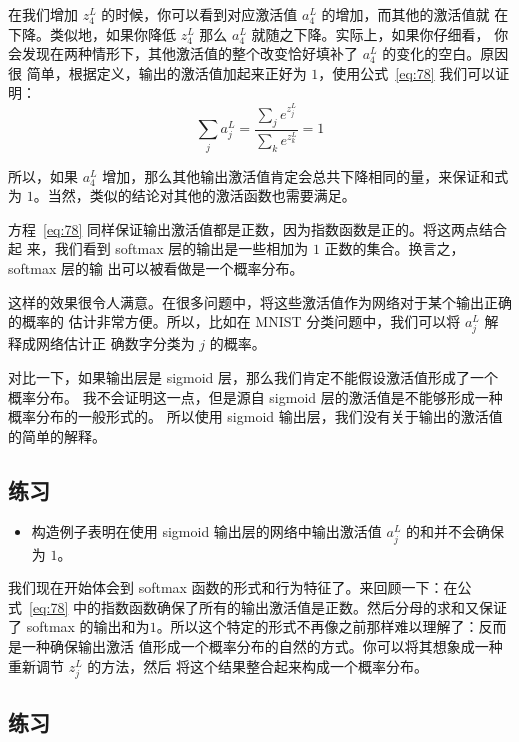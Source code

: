 在我们增加 $z^L_4$ 的时候，你可以看到对应激活值 $a^L_4$ 的增加，而其他的激活值就
在下降。类似地，如果你降低 $z^L_4$ 那么 $a^L_4$ 就随之下降。实际上，如果你仔细看，
你会发现在两种情形下，其他激活值的整个改变恰好填补了 $a^L_4$ 的变化的空白。原因很
简单，根据定义，输出的激活值加起来正好为 $1$，使用公式~\eqref{eq:78} 我们可以证
明：
\begin{equation}
  \sum_j a^L_j = \frac{\sum_j e^{z^L_j}}{\sum_k e^{z^L_k}} = 1
  \label{eq:79}\tag{79}
\end{equation}

所以，如果 $a^L_4$ 增加，那么其他输出激活值肯定会总共下降相同的量，来保证和式
为 $1$。当然，类似的结论对其他的激活函数也需要满足。

方程~\eqref{eq:78} 同样保证输出激活值都是正数，因为指数函数是正的。将这两点结合起
来，我们看到 softmax 层的输出是一些相加为 $1$ 正数的集合。换言之，softmax 层的输
出可以被看做是一个概率分布。

这样的效果很令人满意。在很多问题中，将这些激活值作为网络对于某个输出正确的概率的
估计非常方便。所以，比如在 MNIST 分类问题中，我们可以将 $a^L_j$ 解释成网络估计正
确数字分类为 $j$ 的概率。

对比一下，如果输出层是 sigmoid 层，那么我们肯定不能假设激活值形成了一个概率分布。
我不会证明这一点，但是源自 sigmoid 层的激活值是不能够形成一种概率分布的一般形式的。
所以使用 sigmoid 输出层，我们没有关于输出的激活值的简单的解释。

\subsection*{练习}

\begin{itemize}
\item 构造例子表明在使用 sigmoid 输出层的网络中输出激活值 $a^L_j$ 的和并不会确保
  为 $1$。
\end{itemize}

我们现在开始体会到 softmax 函数的形式和行为特征了。来回顾一下：在公
式~\eqref{eq:78} 中的指数函数确保了所有的输出激活值是正数。然后分母的求和又保证
了 softmax
的输出和为$1$。所以这个特定的形式不再像之前那样难以理解了：反而是一种确保输出激活
值形成一个概率分布的自然的方式。你可以将其想象成一种重新调节 $z^L_j$ 的方法，然后
将这个结果整合起来构成一个概率分布。

\subsection*{练习}

